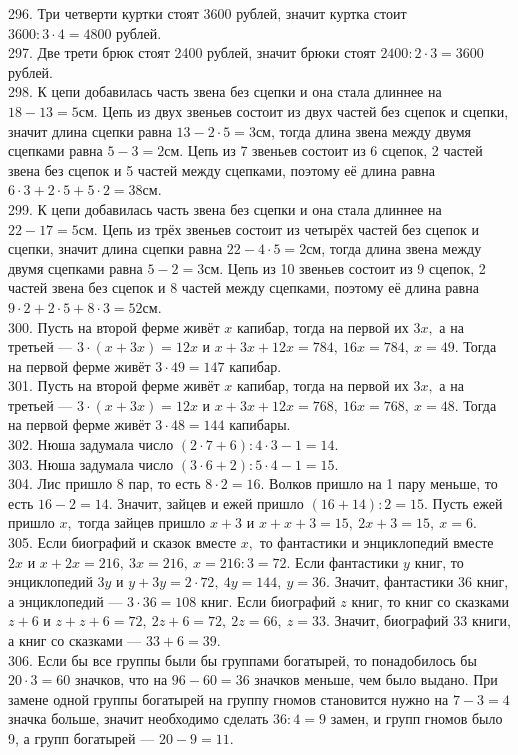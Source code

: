 296. Три четверти куртки стоят 3600 рублей, значит куртка стоит $3600:3\cdot4=4800$ рублей.\\
297. Две трети брюк стоят 2400 рублей, значит брюки стоят $2400:2\cdot3=3600$ рублей.\\
298. К цепи добавилась часть звена без сцепки и она стала длиннее на $18-13=5$см. Цепь из двух звеньев состоит из двух частей без сцепок и сцепки, значит длина сцепки равна $13-2\cdot5=3$см, тогда длина звена между двумя сцепками равна $5-3=2$см. Цепь из 7 звеньев состоит из 6 сцепок, 2 частей звена без сцепок и 5 частей между сцепками, поэтому её длина равна $6\cdot3+2\cdot5+5\cdot2=38$см.\\
299. К цепи добавилась часть звена без сцепки и она стала длиннее на $22-17=5$см. Цепь из трёх звеньев состоит из четырёх частей без сцепок и сцепки, значит длина сцепки равна $22-4\cdot5=2$см, тогда длина звена между двумя сцепками равна $5-2=3$см. Цепь из 10 звеньев состоит из 9 сцепок, 2 частей звена без сцепок и 8 частей между сцепками, поэтому её длина равна $9\cdot2+2\cdot5+8\cdot3=52$см.\\
300. Пусть на второй ферме живёт $x$ капибар, тогда на первой их $3x,$ а на третьей --- $3\cdot(x+3x)=12x$ и $x+3x+12x=784,\ 16x=784,\ x=49.$ Тогда на первой ферме живёт $3\cdot49=147$ капибар.\\
301. Пусть на второй ферме живёт $x$ капибар, тогда на первой их $3x,$ а на третьей --- $3\cdot(x+3x)=12x$ и $x+3x+12x=768,\ 16x=768,\ x=48.$ Тогда на первой ферме живёт $3\cdot48=144$ капибары.\\
302. Нюша задумала число $(2\cdot7+6):4\cdot3-1=14.$\\
303. Нюша задумала число $(3\cdot6+2):5\cdot4-1=15.$\\
304. Лис пришло 8 пар, то есть $8\cdot2=16.$ Волков пришло на 1 пару меньше, то есть $16-2=14.$ Значит, зайцев и ежей пришло $(16+14):2=15.$ Пусть ежей пришло $x,$ тогда зайцев пришло $x+3$ и $x+x+3=15,\ 2x+3=15,\ x=6.$\\
305. Если биографий и сказок вместе $x,$ то фантастики и энциклопедий вместе $2x$ и $x+2x=216,\ 3x=216,\ x=216:3=72.$ Если фантастики $y$ книг, то энциклопедий $3y$ и $y+3y=2\cdot72,\ 4y=144,\ y=36.$ Значит, фантастики 36 книг, а энциклопедий --- $3\cdot36=108$ книг. Если биографий $z$ книг, то книг со сказками $z+6$ и $z+z+6=72,\ 2z+6=72,\ 2z=66,\ z=33.$ Значит, биографий 33 книги, а книг со сказками --- $33+6=39.$\\
306. Если бы все группы были бы группами богатырей, то понадобилось бы $20\cdot3=60$ значков, что на $96-60=36$ значков меньше, чем было выдано. При замене одной группы богатырей на группу гномов становится нужно на $7-3=4$ значка больше, значит необходимо сделать $36:4=9$ замен, и групп гномов было 9, а групп богатырей --- $20-9=11.$\\
